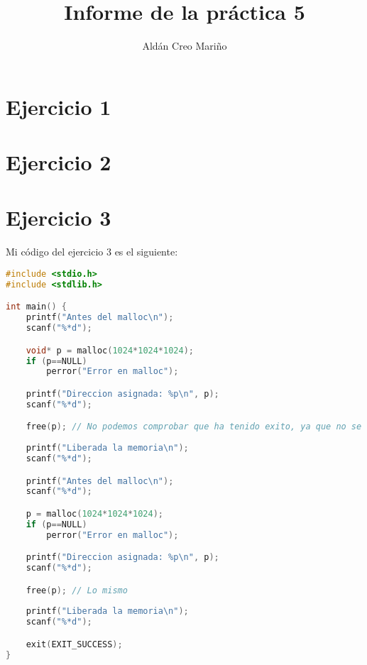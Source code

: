 \documentclass[a4paper]{article}
\title{Informe de la práctica 5}
\author{Aldán Creo Mariño}
\begin{document}
\maketitle

\section{Ejercicio 1}



\section{Ejercicio 2}



\section{Ejercicio 3}

Mi código del ejercicio 3 es el siguiente:

\begin{lstlisting}[language=C]
#include <stdio.h>
#include <stdlib.h>

int main() {
    printf("Antes del malloc\n");
    scanf("%*d");

    void* p = malloc(1024*1024*1024);
    if (p==NULL)
        perror("Error en malloc");

    printf("Direccion asignada: %p\n", p);
    scanf("%*d");

    free(p); // No podemos comprobar que ha tenido exito, ya que no se devuelve nada
    
    printf("Liberada la memoria\n");
    scanf("%*d");

    printf("Antes del malloc\n");
    scanf("%*d");

    p = malloc(1024*1024*1024);
    if (p==NULL)
        perror("Error en malloc");

    printf("Direccion asignada: %p\n", p);
    scanf("%*d");

    free(p); // Lo mismo
    
    printf("Liberada la memoria\n");
    scanf("%*d");

    exit(EXIT_SUCCESS);
}
\end{lstlisting}
\end{document}
